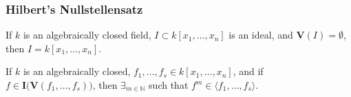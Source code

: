 \documentclass[crop=false,class=book,oneside]{standalone}
\begin{document}
            \subsubsection{Hilbert's Nullstellensatz}
                \begin{theorem}
                    If $k$ is an algebraically closed field,
                    $I\subset k[x_1,\hdots ,x_n]$ is an ideal,
                    and $\mathbf{V}(I)=\emptyset$,
                    then $I=k[x_1,\hdots ,x_n]$.
                \end{theorem}
                \begin{theorem}
                    If $k$ is an algebraically closed,
                    $f_{1},\hdots,f_{s}\in k[x_{1},\hdots,x_{n}]$,
                    and if
                    $f\in\textbf{I}\big(\mathbf{V}(f_1,\hdots,f_s)\big)$,
                    then $\exists_{m\in\mathbb{N}}$ such that
                    $f^m \in \langle f_1,\hdots, f_s \rangle$.
                \end{theorem}
\end{document}
